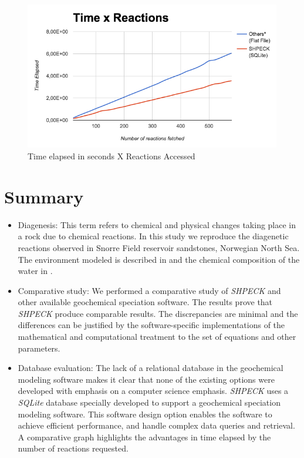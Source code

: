 \begin{figure}[ht!]
\centering
\includegraphics[width=140mm]{figures/timeXreactionAccess.png}
\caption{Time elapsed in seconds X Reactions Accessed}
\label{fig:timeXaccess}
\end{figure}



\newpage

\section{Summary}
\begin{itemize}
    \item Diagenesis: This term refers to chemical and physical changes taking place in a rock due to chemical reactions. In this study we reproduce the diagenetic reactions observed in Snorre Field reservoir sandstones, Norwegian North Sea. 
    The environment modeled is described in \cite{Morad:90} and the chemical composition of the water in \cite{Nordstrom:79}.
    \item Comparative study: We performed a comparative study of \emph{SHPECK} and other available geochemical speciation software. The results prove that \emph{SHPECK} produce comparable results. The discrepancies are minimal and the differences can be justified by the software-specific implementations of the mathematical and computational treatment to the set of equations and other parameters. 
    \item Database evaluation: The lack of a relational database in the geochemical modeling software makes it clear that none of the existing options were developed with emphasis on a computer science emphasis. \emph{SHPECK} uses a \emph{SQLite} database specially developed to support a geochemical speciation modeling software. This software design option enables the software to achieve efficient performance, and handle complex data queries and retrieval. A comparative graph highlights the advantages in time elapsed by the number of reactions requested.
\end{itemize}